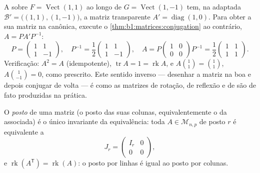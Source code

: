 \begin{example}
\label{ex:b1:matrices:reverserun}
A  sobre $F = \operatorname{Vect}(1,1)$ ao longo de $G =
\operatorname{Vect}(1,-1)$ tem, na  adaptada
$\mathcal
B' = \bigl((1,1),(1,-1)\bigr)$, a matriz transparente $A' =
\operatorname{diag}(1, 0)$. Para obter a sua matriz na 
canônica, execute o \cref{thm:b1:matrices:conjugation} ao contrário, $A = P A'
P^{-1}$:
\[
P = \begin{pmatrix} 1 & 1\\ 1 & -1\end{pmatrix},
\quad
P^{-1} = \frac12\begin{pmatrix} 1 & 1\\ 1 & -1\end{pmatrix},
\quad
A = P\begin{pmatrix} 1 & 0\\ 0 & 0\end{pmatrix}P^{-1}
= \frac12\begin{pmatrix} 1 & 1\\ 1 & 1\end{pmatrix}.
\]
Verificação: $A^2 = A$ (idempotente), $\operatorname{tr} A = 1 =
\operatorname{rk} A$, e $A\binom{1}{1} = \binom11$, $A\binom{1}{-1} = 0$, como
prescrito. Este sentido inverso --- desenhar a matriz na  boa e
depois conjugar de volta --- é como as matrizes de rotação, de
reflexão e de  são de fato produzidas na prática.
\end{example}

\begin{theorem}\label{thm:b1:matrices:rank}
O \emph{posto} de uma matriz (o posto das suas colunas,
equivalentemente o da  associada) é o único
invariante da equivalência: toda $A \in \mathcal{M}_{n,p}$ de posto $r$ é equivalente a
\[
J_r = \begin{pmatrix} I_r & 0 \\ 0 & 0 \end{pmatrix},
\]
e $\operatorname{rk}(A^{\mathsf T}) = \operatorname{rk}(A)$: o posto por linhas é igual ao posto por colunas.
\end{theorem}

